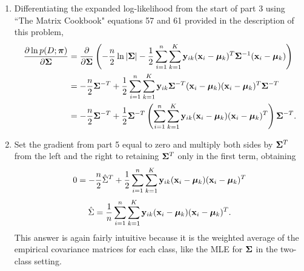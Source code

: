 \documentclass[submit]{harvardml}
\begin{document}
\begin{enumerate}
	\item Differentiating the expanded log-likelihood from the start of part 3 using ``The Matrix Cookbook" equations 57 and 61 provided in the description of this problem,
	\begin{align*}
		\frac{\partial \ln p(D; \boldsymbol{\pi})}{\partial \mathbf{\Sigma}} &= \frac{\partial}{\partial \mathbf{\Sigma}} \left( - \frac{n}{2}\ln |\mathbf{\Sigma}| -\frac12 \sum_{i=1}^{n}\sum_{k=1}^K \mathbf{y}_{ik} (\mathbf{x}_i - \boldsymbol{\mu}_k)^T \mathbf{\Sigma}^{-1} (\mathbf{x}_i - \boldsymbol{\mu}_k) \right) \\
		&= -\frac{n}{2} \mathbf{\Sigma}^{-T} + \frac12 \sum_{i=1}^{n}\sum_{k=1}^K \mathbf{y}_{ik} \mathbf{\Sigma}^{-T} (\mathbf{x}_i - \boldsymbol{\mu}_k)(\mathbf{x}_i - \boldsymbol{\mu}_k)^T \mathbf{\Sigma}^{-T} \\
		&= -\frac{n}{2} \mathbf{\Sigma}^{-T} + \frac12 \mathbf{\Sigma}^{-T} \left( \sum_{i=1}^{n}\sum_{k=1}^K \mathbf{y}_{ik} (\mathbf{x}_i - \boldsymbol{\mu}_k)(\mathbf{x}_i - \boldsymbol{\mu}_k)^T \right) \mathbf{\Sigma}^{-T}.
	\end{align*}
	
	\item Set the gradient from part 5 equal to zero and multiply both sides by $\mathbf{\Sigma}^T$ from the left and the right to retaining $\mathbf{\Sigma}^T$ only in the first term, obtaining
	$$0 = -\frac{n}{2} \hat \Sigma^T + \frac12 \sum_{i=1}^{n}\sum_{k=1}^K \mathbf{y}_{ik} (\mathbf{x}_i - \boldsymbol{\mu}_k)(\mathbf{x}_i - \boldsymbol{\mu}_k)^T$$
	$$\hat \Sigma = \frac1{n} \sum_{i=1}^n \sum_{k=1}^K \mathbf{y}_{ik}(\mathbf{x}_i - \boldsymbol{\mu}_k)(\mathbf{x}_i - \boldsymbol{\mu}_k)^T.$$
	This answer is again fairly intuitive because it is the weighted average of the empirical covariance matrices for each class, like the MLE for $\mathbf{\Sigma}$ in the two-class setting.
	
\end{enumerate}

\end{document}

